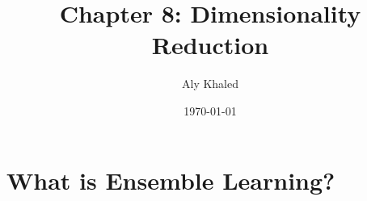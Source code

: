 \documentclass{article}
\title{Chapter 8: Dimensionality Reduction}
\author{Aly Khaled}
\date{\today}
\begin{document}
 
    \maketitle
    \section{What is Ensemble Learning?}
\end{document}
